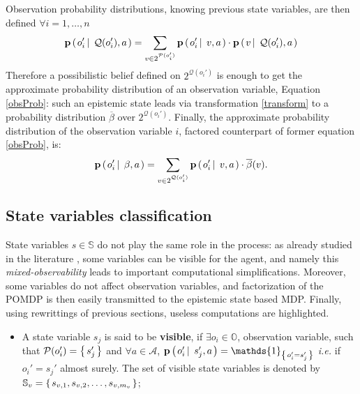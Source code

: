 Observation probability distributions, knowing previous state variables, 
are then defined $\forall i=1,\ldots,n$
\begin{equation}
\label{obsDistrib} \textbf{p} \left( \left.  o_i' \, \right| \left. \, \mathcal{Q}(o_i'), a  \right. \right) = \sum_{ v \in 2^{\mathcal{P}(o'_i)}} \textbf{p} \left( \left.  o'_i \, \right| \left. \, v ,a  \right. \right) \cdot \textbf{p} \left( \left.  v \, \right| \left. \, \mathcal{Q}(o_i') ,a \right. \right)
\end{equation}
Therefore a possibilistic belief defined on $2^{ \mathcal{Q}(o_i')}$ is enough to
get the approximate probability distribution of an observation variable, Equation \ref{obsProb}: 
such an epistemic state
leads via transformation \ref{transform} to a probability distribution $\overline{\beta}$
over $2^{\mathcal{Q}(o_i')}$. 
Finally, the approximate probability distribution of the observation variable $i$,
factored counterpart of former equation \ref{obsProb}, is:
\begin{equation}
\label{probObel}
\textbf{p} \left( \left.  o_i' \, \right| \left. \, \beta,a  \right. \right) = \sum_{ v \in 2^{\mathcal{Q}(o_i')}} \textbf{p} \left( \left.  o_i' \, \right| \left. \, v,a  \right. \right) \cdot \overline{\beta}(v).
\end{equation}

\subsection{State variables classification}
\label{classif}
State variables $s \in \mathbb{S}$ do not play the same role
in the process: as already studied in the literature \cite{OngShaoHsuWee-IJRR10},
some variables can be visible for the agent, and namely this \textit{mixed-observability}
leads to important computational simplifications. Moreover, some variables do not
affect observation variables, and factorization of the POMDP is then easily transmitted
to the epistemic state based MDP. Finally, using rewrittings of previous sections,
useless computations are highlighted.
\begin{itemize}
\item A state variable $s_j$ is said to be \textbf{visible}, if $\exists o_i \in \mathbb{O}$, 
observation variable, such that $\mathcal{P}(o_i') = \left\{ \left.  s_j'  \right. \right\}$ 
and $\forall a \in \mathcal{A}$, $\textbf{p} \paren{ o_i' \sachant s_j',a } = \mathds{1}_{ \set{o_i' = s_j'}}$
\textit{i.e.} if $o_i' = s_j'$ almost surely. The set of visible state variables is denoted by 
$\mathbb{S}_v = \left\{ \left. s_{v,1}, s_{v,2}, \ldots, s_{v,m_{v}} \right. \right\}$;
\end{itemize}

